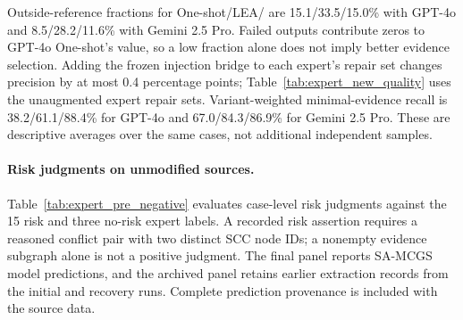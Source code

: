 Outside-reference fractions for One-shot/LEA/\samcgs{} are 15.1/33.5/15.0\% with GPT-4o and 8.5/28.2/11.6\% with Gemini 2.5 Pro. Failed outputs contribute zeros to GPT-4o One-shot's value, so a low fraction alone does not imply better evidence selection. Adding the frozen injection bridge to each expert's repair set changes precision by at most 0.4 percentage points; Table~\ref{tab:expert_new_quality} uses the unaugmented expert repair sets. Variant-weighted minimal-evidence recall is 38.2/61.1/88.4\% for GPT-4o and 67.0/84.3/86.9\% for Gemini 2.5 Pro. These are descriptive averages over the same cases, not additional independent samples.

\begin{revadded}
\paragraph{Risk judgments on unmodified sources.}
Table~\ref{tab:expert_pre_negative} evaluates case-level risk judgments against the 15 risk and three no-risk expert labels. A recorded risk assertion requires a reasoned conflict pair with two distinct SCC node IDs; a nonempty evidence subgraph alone is not a positive judgment. The final panel reports SA-MCGS model predictions, and the archived panel retains earlier extraction records from the initial and recovery runs. Complete prediction provenance is included with the source data.


\end{revadded}

